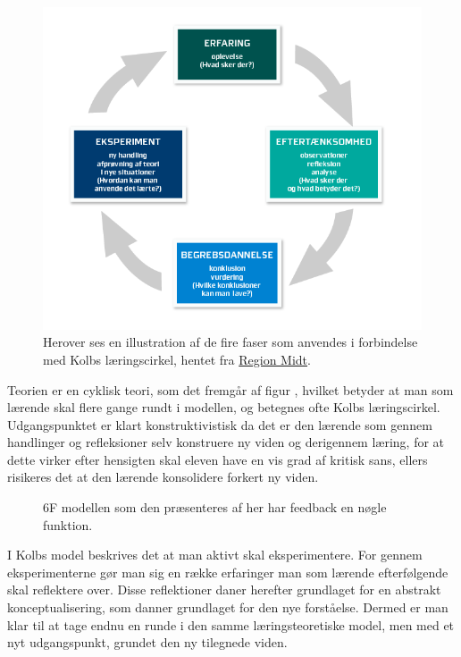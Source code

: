 \begin{figure}[h!]
	\centering
	\includegraphics[width=\textwidth]{Figs/kolb}
	\caption[Kolbs læringscirkel]{Herover ses en illustration af de fire faser som anvendes i forbindelse med Kolbs læringscirkel, hentet fra  \href{https://www.rm.dk/om-os/organisation/koncern-hr/uddannelse-udvikling-og-arbejdsmiljo/center-for-kompetenceudvikling/hvad-kan-vi-tilbyde/vejledning/varktojer/kolb/}{Region Midt}.}
	\label{fig:kolb}
\end{figure}

Teorien er en cyklisk teori, som det fremgår af figur , hvilket betyder at man som lærende skal flere gange rundt i modellen, og betegnes ofte Kolbs læringscirkel. Udgangspunktet er klart konstruktivistisk da det er den lærende som gennem handlinger og refleksioner selv konstruere ny viden og derigennem læring, for at dette virker efter hensigten skal eleven have en vis grad af kritisk sans, ellers risikeres det at den lærende konsolidere forkert ny viden. 

\begin{figure}
	\centering
	\vspace{-20pt}
	\caption[6F modellen]{6F modellen som den præsenteres af \citep{Dolin2014} her har feedback en nøgle funktion. }
	\label{fig:6F}
\vspace{-20pt}
\end{figure}
\noindent I Kolbs model beskrives det at man aktivt skal eksperimentere. For gennem eksperimenterne gør man sig en række erfaringer man som lærende efterfølgende skal reflektere over. Disse reflektioner daner herefter grundlaget for en abstrakt konceptualisering, som danner grundlaget for den nye forståelse. Dermed er man klar til at tage endnu en runde i den samme læringsteoretiske model, men med et nyt udgangspunkt, grundet den ny tilegnede viden. 

